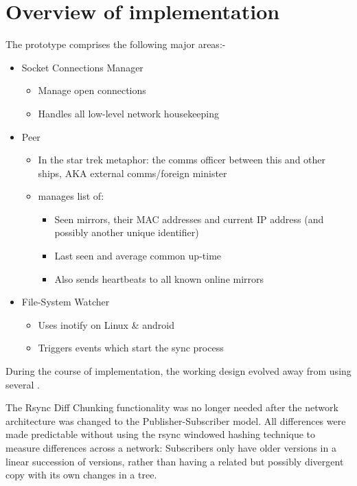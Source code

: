 \documentclass[12pt,a4paper,]{adreport}
\begin{document}
\section{Overview of implementation}\label{overview-of-implementation}

The prototype comprises the following major areas:-

\begin{itemize}
\itemsep1pt\parskip0pt
\item
  Socket Connections Manager

  \begin{itemize}
  \itemsep1pt\parskip0pt
  \item
    Manage open connections
  \item
    Handles all low-level network housekeeping
  \end{itemize}
\item
  Peer

  \begin{itemize}
  \itemsep1pt\parskip0pt
  \item
    In the star trek metaphor: the comms officer between this and other
    ships, AKA external comms/foreign minister
  \item
    manages list of:

    \begin{itemize}
    \itemsep1pt\parskip0pt
    \item
      Seen mirrors, their MAC addresses and current IP address (and
      possibly another unique identifier)
    \item
      Last seen and average common up-time
    \item
      Also sends heartbeats to all known online mirrors
    \end{itemize}
  \end{itemize}
\item
  File-System Watcher

  \begin{itemize}
  \itemsep1pt\parskip0pt
  \item
    Uses inotify on Linux \& android
  \item
    Triggers events which start the sync process
  \end{itemize}
\end{itemize}

During the course of implementation, the working design evolved away
from using several .

The Rsync Diff Chunking functionality was no longer needed after the
network architecture was changed to the Publisher-Subscriber model. All
differences were made predictable without using the rsync windowed
hashing technique to measure differences across a network: Subscribers
only have older versions in a linear succession of versions, rather than
having a related but possibly divergent copy with its own changes in a
tree.
\end{document}
